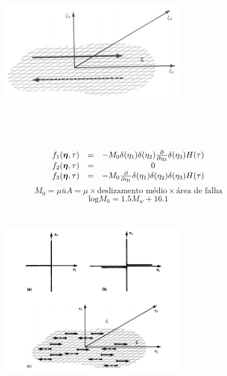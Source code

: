 \documentclass{beamer}
\begin{document}
\begin{frame}
	\begin{figure}[htb]
		\centering
		\includegraphics[width= 8cm, height= 8cm]{superficie}
	\end{figure}
\end{frame}

\begin{frame}
	\begin{equation}
	\begin{matrix}
	f_1(\boldsymbol{\eta},\tau) &=& -M_0\delta(\eta_1)\delta(\eta_2)\frac{\partial}{\partial \eta_3}\delta(\eta_3)H(\tau) \nonumber \\
	f_2(\boldsymbol{\eta},\tau)& =& 0 \nonumber \\
	f_3(\boldsymbol{\eta},\tau) &=& -M_0\frac{\partial}{\partial \eta_1}\delta(\eta_1)\delta(\eta_2)\delta(\eta_3)H(\tau)
	\end{matrix}
	\end{equation}
	$$M_0 =  \mu \bar{u}A = \mu \times \text{deslizamento médio} \times \text{área de falha} $$
	$$\text{log} M_0 = 1.5 M_w + 16.1 $$
\end{frame}



\begin{frame}
	\begin{figure}[htb]
		\centering
		\includegraphics[width= 8cm, height= 8cm]{diagramas}
	\end{figure}
\end{frame}
\end{document}
